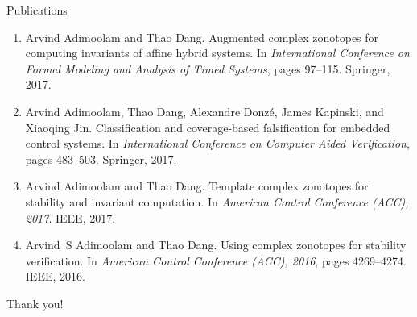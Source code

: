 \begin{frame}{Publications}
\begin{enumerate}
\item Arvind Adimoolam and Thao Dang.
\newblock Augmented complex zonotopes for computing invariants of affine hybrid
  systems.
\newblock In {\em International Conference on Formal Modeling and Analysis of
  Timed Systems}, pages 97--115. Springer, 2017.

\item %
Arvind Adimoolam, Thao Dang, Alexandre Donz{\'e}, James Kapinski, and Xiaoqing
  Jin.
\newblock Classification and coverage-based falsification for embedded control
  systems.
\newblock In {\em International Conference on Computer Aided Verification},
  pages 483--503. Springer, 2017.


\item %
Arvind Adimoolam and Thao Dang.
\newblock Template complex zonotopes for stability and invariant computation.
\newblock In {\em American Control Conference (ACC), 2017}. IEEE, 2017.


\item %
Arvind~S Adimoolam and Thao Dang.
\newblock Using complex zonotopes for stability verification.
\newblock In {\em American Control Conference (ACC), 2016}, pages 4269--4274.
  IEEE, 2016.
\end{enumerate}
\end{frame}


\begin{frame}{}
\center
{\Huge {\color{blue} Thank you!}}
\end{frame}






